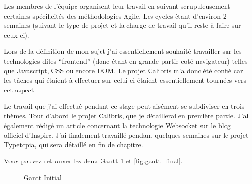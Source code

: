 \documentclass[12pt,a4paper]{book}
\begin{document}
Les membres de l'équipe organisent leur travail en suivant scrupuleusement certaines spécificités des méthodologies Agile. Les cycles étant d'environ 2 semaines (suivant le type de projet et la charge de travail qu'il reste à faire sur ceux-ci).

Lors de la définition de mon sujet j'ai essentiellement souhaité travailler sur les technologies dites ``frontend'' (donc étant en grande partie coté navigateur) telles que Javascript, CSS ou encore DOM. Le projet Calibris m'a donc été confié car les tâches qui étaient à effectuer sur celui-ci étaient essentiellement tournées vers cet aspect.

Le travail que j'ai effectué pendant ce stage peut aisément se subdiviser en trois thèmes. Tout d'abord le projet Calibris, que je détaillerai en première partie. J'ai également rédigé un article concernant la technologie Websocket sur le blog officiel d'Inspire. J'ai finalement travaillé pendant quelques semaines sur le projet Typetopia, qui sera détaillé en fin de chapitre.

Vous pouvez retrouver les deux Gantt \cref{fig.gantt_initial} et \cref{fig.gantt_final}.

\begin{landscape}
\begin{figure}[htp] 
	\caption{Gantt Initial}
	\label{fig.gantt_initial}
\end{figure}
\end{landscape}
\end{document}
